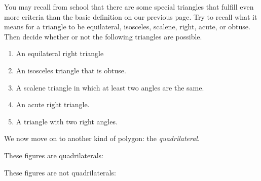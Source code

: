 \documentclass[nooutcomes,noauthor]{ximera}
\begin{document}
\begin{problem} You may recall from school that there are some special triangles that fulfill even more criteria than the basic definition on our previous page.  Try to recall what it means for a triangle to be equilateral, isosceles, scalene, right, acute, or obtuse.  Then decide whether or not the following triangles are possible.
\begin{enumerate}
\item An equilateral right triangle
\item An isosceles triangle that is obtuse.
\item A scalene triangle in which at least two angles are the same.
\item An acute right triangle.
\item A triangle with two right angles.
\end{enumerate}

\end{problem}

\pagebreak
 We now move on to another kind of polygon: the {\em quadrilateral}.

These figures are quadrilaterals:

\begin{image}
\end{image}

These figures are not quadrilaterals:
\begin{image}  \end{image}
\end{document}
